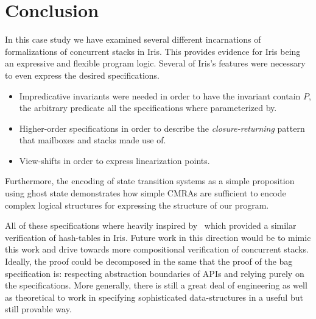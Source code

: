 \section{Conclusion}

In this case study we have examined several different incarnations of
formalizations of concurrent stacks in Iris. This provides evidence
for Iris being an expressive and flexible program logic. Several of
Iris's features were necessary to even express the desired
specifications.
\begin{itemize}
\item Impredicative invariants were needed in order to have the
  invariant contain $P$, the arbitrary predicate all the
  specifications where parameterized by.
\item Higher-order specifications in order to describe the
  \emph{closure-returning} pattern that mailboxes and stacks made use
  of.
\item View-shifts in order to express linearization points.
\end{itemize}
Furthermore, the encoding of state transition systems as a simple
proposition using ghost state demonstrates how simple CMRAs are
sufficient to encode complex logical structures for expressing the
structure of our program.

All of these specifications where heavily inspired
by~\citet{Clausen:2017} which provided a similar verification of
hash-tables in Iris. Future work in this direction would be to mimic
this work and drive towards more compositional verification of
concurrent stacks. Ideally, the proof could be decomposed in the same
that the proof of the bag specification is: respecting abstraction
boundaries of APIs and relying purely on the specifications. More
generally, there is still a great deal of engineering as well as
theoretical to work in specifying sophisticated data-structures in a
useful but still provable way.

